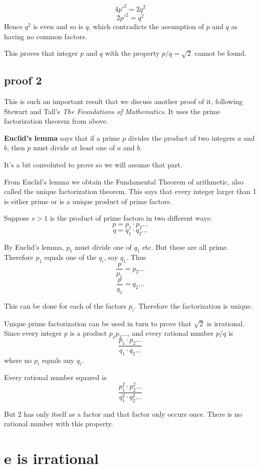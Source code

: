 \documentclass[11pt, oneside]{article}
\begin{document}
\[ 4 p'^2 = 2 q^2 \]
\[ 2 p'^2 = q^2 \]
Hence $q^2$ is even and so is $q$, which contradicts the assumption of $p$ and $q$ as having no common factors.  

This proves that integer $p$ and $q$ with the property $p/q = \sqrt{2}$ cannot be found.

\subsection*{proof 2}

This is such an important result that we discuss another proof of it, following Stewart and Tall's \emph{The Foundations of Mathematics}.  It uses the prime factorization theorem from above.  

\textbf{Euclid's lemma} says that if a prime $p$ divides the product of two integers $a$ and $b$, then $p$ must divide at least one of $a$ and $b$.

It's a bit convoluted to prove so we will assume that part.  

From Euclid's lemma we obtain the Fundamental Theorem of arithmetic, also called the unique factorization theorem.  This says that every integer larger than 1 is either prime or is a unique product of prime factors.

Suppose $s > 1$ is the product of prime factors in two different ways:
\[ p = p_1 \cdot p_2 \dots \]
\[ q = q_1 \cdot q_2 \dots \]

By Euclid's lemma, $p_1$ must divide one of $q_1$ etc.  But these are all prime.  Therefore $p_1$ equals one of the $q_i$, say $q_1$.  Thus
\[ \frac{p}{p_1} = p_2 \dots \]
\[ \frac{p}{q_1} = q_2 \dots \]

This can be done for each of the factors $p_i$.  Therefore the factorization is unique.

Unique prime factorization can be used in turn to prove that $\sqrt{2}$ is irrational.  Since every integer $p$ is a product $p_1 p_2 \dots$, and every rational number $p/q$ is
\[ \frac{p_1 \cdot p_2 \dots}{q_1 \cdot q_2 \dots} \]
where no $p_i$ equals any $q_i$.

Every rational number squared is 
\[ \frac{p_1^2 \cdot p_2^2 \dots}{q_1^2 \cdot q_2^2 \dots} \]

But $2$ has only itself as a factor and that factor only occurs once.  There is no rational number with this property.

\section{e is irrational}
\end{document}
